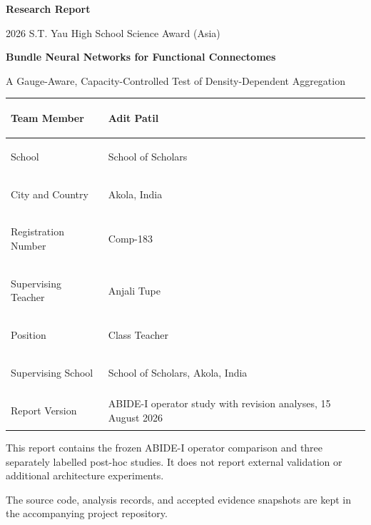 \documentclass[11pt,a4paper]{article}
\newcommand{\draftnote}{This report contains the frozen ABIDE-I operator comparison and three separately labelled post-hoc studies. It does not report external validation or additional architecture experiments.}
\begin{document}
\hypersetup{pageanchor=false}

\thispagestyle{empty}
\begin{center}
  {\Large\bfseries Research Report}\par
  \vspace{0.35em}
  {\large 2026 S.T. Yau High School Science Award (Asia)}\par
  \vspace{2.0cm}
  {\LARGE\bfseries Bundle Neural Networks for Functional Connectomes}\par
  \vspace{0.35em}
  {\Large A Gauge-Aware, Capacity-Controlled Test of Density-Dependent Aggregation}\par
  \vspace{1.2cm}
\end{center}

\renewcommand{\arraystretch}{1.35}
\noindent\begin{tabularx}{\textwidth}{|>{\bfseries\raggedright\arraybackslash}p{3.6cm}|Y|}
\hline
Team Member & Adit Patil \\
\hline
School & School of Scholars \\
\hline
City and Country & Akola, India \\
\hline
Registration Number & Comp-183 \\
\hline
Supervising Teacher & Anjali Tupe \\
\hline
Position & Class Teacher \\
\hline
Supervising School & School of Scholars, Akola, India \\
\hline
Report Version & ABIDE-I operator study with revision analyses, 15 August 2026 \\
\hline
\end{tabularx}

\vfill
\noindent\begin{minipage}{\textwidth}
\small\color{muted}
\draftnote

The source code, analysis records, and accepted evidence snapshots are kept in
the accompanying project repository.
\end{minipage}
\clearpage

\hypersetup{pageanchor=true}
\setcounter{page}{1}
\end{document}
